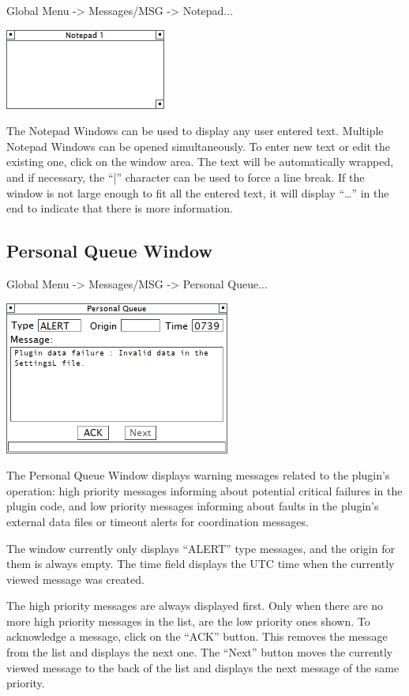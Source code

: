 \documentclass[11pt,a4paper,oldfontcommands]{memoir}
\begin{document}
Global Menu -> Messages/MSG -> Notepad...

\includegraphics{img/note.png}

The Notepad Windows can be used to display any user entered text. Multiple Notepad Windows can be opened simultaneously. To enter new text or edit the existing one, click on the window area. The text will be automatically wrapped, and if necessary, the “|” character can be used to force a line break. If the window is not large enough to fit all the entered text, it will display “…” in the end to indicate that there is more information.

\subsection{Personal Queue Window}
\label{win:pqw}

Global Menu -> Messages/MSG -> Personal Queue...

\includegraphics{img/pq.png}

The Personal Queue Window displays warning messages related to the plugin’s operation: high priority messages informing about potential critical failures in the plugin code, and low priority messages informing about faults in the plugin’s external data files or timeout alerts for coordination messages.

The window currently only displays “ALERT” type messages, and the origin for them is always empty. The time field displays the UTC time when the currently viewed message was created.

The high priority messages are always displayed first. Only when there are no more high priority messages in the list, are the low priority ones shown. To acknowledge a message, click on the “ACK” button. This removes the message from the list and displays the next one. The “Next” button moves the currently viewed message to the back of the list and displays the next message of the same priority.
\end{document}
